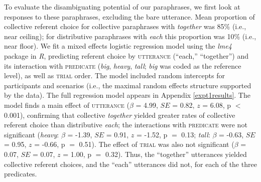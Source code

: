 \documentclass[linguex]{sp}
\newcommand{\ndg}[1]{\textcolor{Green}{[ndg: #1]}}
\newcommand{\gcs}[1]{\textcolor{blue}{[gcs: #1]}}
\begin{document}
To evaluate the disambiguating potential of our paraphrases, we first look at responses to these paraphrases, excluding the bare utterance. Mean proportion of collective referent choice for collective paraphrases with \emph{together} was 85\% (i.e., near ceiling); for distributive paraphrases with \emph{each} this proportion was 10\% (i.e., near floor). We fit a mixed effects logistic regression model \citep{baayenetal2008} using the \emph{lme4} package \citep{batesetal2014} in \emph{R}, predicting referent choice by \textsc{utterance} (``each,'' ``together'') and its interaction with \textsc{predicate} (\emph{big}, \emph{heavy}, \emph{tall}; \emph{big} was coded as the reference level), as well as \textsc{trial} order.  The model included random intercepts for participants and scenarios (i.e., the maximal random effects structure supported by the data). The full regression model appears in Appendix \ref{expt1results}. The model finds a main effect of \textsc{utterance} ($\beta$ = 4.99, $SE$ = 0.82, $z$ = 6.08, p $<$ 0.001), confirming that collective \emph{together} yielded greater rates of collective referent choice than distributive \emph{each}; the interactions with \textsc{predicate} were not significant (\emph{heavy}: $\beta$ = -1.39, $SE$ = 0.91, $z$ = -1.52, p $=$ 0.13; \emph{tall}: $\beta$ = -0.63, $SE$ = 0.95, $z$ = -0.66, p $=$ 0.51). The effect of \textsc{trial} was also not significant ($\beta$ = 0.07, $SE$ = 0.07, $z$ = 1.00, p $=$ 0.32). Thus, the ``together'' utterances yielded collective referent choices, and the ``each'' utterances did not, for each of the three predicates.
\end{document}
